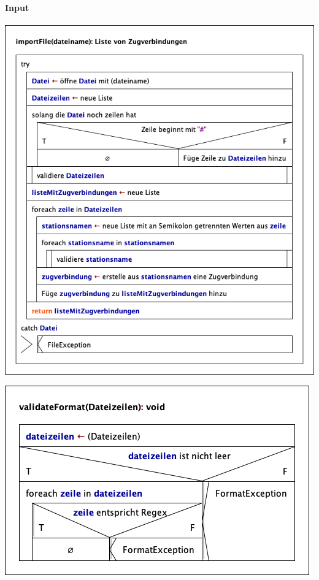 \paragraph{Input}\label{pro:subsubsecpar:input}
\begin{center}
    \includegraphics[width=\linewidth]{images/Struktogramme/io/importFile.png}
    \label{pro:subsubsecpar:inputFile}
\end{center}

\begin{center}
    \includegraphics[width=\linewidth]{images/Struktogramme/io/validateFormat.png}
    \label{pro:subsubsecpar:format-validator}
\end{center}

